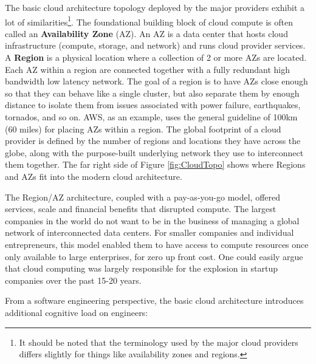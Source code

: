 \documentclass[conference]{IEEEconf}
\begin{document}
The basic cloud architecture topology deployed by the major providers exhibit a lot of similarities\footnote{It should be noted that the terminology used by the major cloud providers differs slightly for things like availability zones and regions.}.  The foundational building block of cloud compute is often called an \textbf{Availability Zone} (AZ).  An AZ is a data center that hosts cloud infrastructure (compute, storage, and network) and runs cloud provider services.  A \textbf{Region} is a physical location where a collection of 2 or more AZs are located.  Each AZ within a region are connected together with a fully redundant high bandwidth low latency network.  The goal of a region is to have AZs close enough so that they can behave like a single cluster, but also separate them by enough distance to isolate them from issues associated with power failure, earthquakes, tornados, and so on.  AWS, as an example, uses the general guideline of 100km (60 miles)\cite{AWS-AZ} for placing AZs within a region. The global footprint of a cloud provider is defined by the number of regions and locations they have across the globe, along with the purpose-built underlying network they use to interconnect them together. The far right side of Figure \ref{fig:CloudTopo} shows where Regions and AZs fit into the modern cloud architecture.

The Region/AZ architecture, coupled with a pay-as-you-go model, offered services, scale and financial benefits that disrupted compute.  The largest companies in the world do not want to be in the business of managing a global network of interconnected data centers. For smaller companies and individual entrepreneurs, this model enabled them to have access to compute resources once only available to large enterprises, for zero up front cost.  One could easily argue that cloud computing was largely responsible for the explosion in startup companies over the past 15-20 years. 

From a software engineering perspective, the basic cloud architecture introduces additional cognitive load on engineers:
\end{document}
